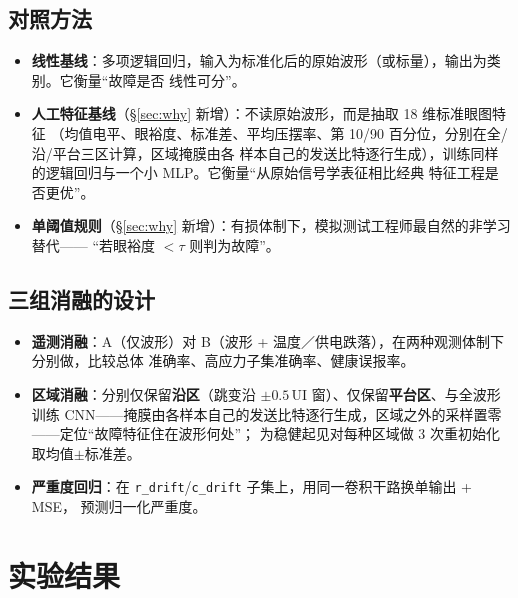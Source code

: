 \documentclass[11pt,a4paper,fontset=mac]{ctexart}
\begin{document}
\subsection{对照方法}
\begin{itemize}
\item \textbf{线性基线}：多项逻辑回归，输入为标准化后的原始波形（或标量），输出为类别。它衡量“故障是否
线性可分”。
\item \textbf{人工特征基线}（\S\ref{sec:why} 新增）：不读原始波形，而是抽取 18 维标准眼图特征
（均值电平、眼裕度、标准差、平均压摆率、第 10/90 百分位，分别在全/沿/平台三区计算，区域掩膜由各
样本自己的发送比特逐行生成），训练同样的逻辑回归与一个小 MLP。它衡量“从原始信号学表征相比经典
特征工程是否更优”。
\item \textbf{单阈值规则}（\S\ref{sec:why} 新增）：有损体制下，模拟测试工程师最自然的非学习替代——
“若眼裕度 $<\tau$ 则判为故障”。
\end{itemize}

\subsection{三组消融的设计}
\begin{itemize}
\item \textbf{遥测消融}：A（仅波形）对 B（波形 + 温度／供电跌落），在两种观测体制下分别做，比较总体
准确率、高应力子集准确率、健康误报率。
\item \textbf{区域消融}：分别仅保留\textbf{沿区}（跳变沿 $\pm0.5$\,UI 窗）、仅保留\textbf{平台区}、与全波形
训练 CNN——掩膜由各样本自己的发送比特逐行生成，区域之外的采样置零——定位“故障特征住在波形何处”；
为稳健起见对每种区域做 3 次重初始化取均值$\pm$标准差。
\item \textbf{严重度回归}：在 \texttt{r\_drift}/\texttt{c\_drift} 子集上，用同一卷积干路换单输出 + MSE，
预测归一化严重度。
\end{itemize}

\section{实验结果}
\end{document}
